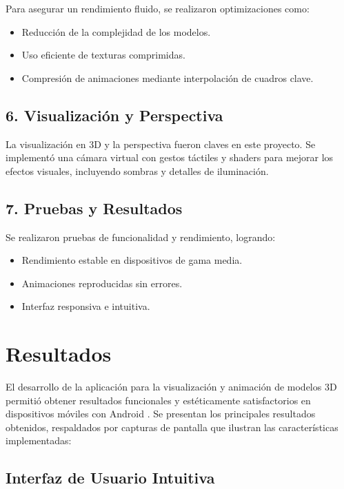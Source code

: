 \documentclass[conference]{IEEEtran}
\begin{document}
Para asegurar un rendimiento fluido, se realizaron optimizaciones como:

\begin{itemize}
    \item Reducción de la complejidad de los modelos.
    \item Uso eficiente de texturas comprimidas.
    \item Compresión de animaciones mediante interpolación de cuadros clave.
\end{itemize}

\subsection{6. Visualización y Perspectiva}

La visualización en 3D y la perspectiva fueron claves en este proyecto. Se implementó una cámara virtual con gestos táctiles y shaders para mejorar los efectos visuales, incluyendo sombras y detalles de iluminación.

\subsection{7. Pruebas y Resultados}

Se realizaron pruebas de funcionalidad y rendimiento, logrando:

\begin{itemize}
    \item Rendimiento estable en dispositivos de gama media.
    \item Animaciones reproducidas sin errores.
    \item Interfaz responsiva e intuitiva.
\end{itemize}


\section{Resultados}

El desarrollo de la aplicación para la visualización y animación de modelos 3D permitió obtener resultados funcionales y estéticamente satisfactorios en dispositivos móviles con Android \cite{gameDevAndroid}. Se presentan los principales resultados obtenidos, respaldados por capturas de pantalla que ilustran las características implementadas:

\subsection{Interfaz de Usuario Intuitiva}
\end{document}
